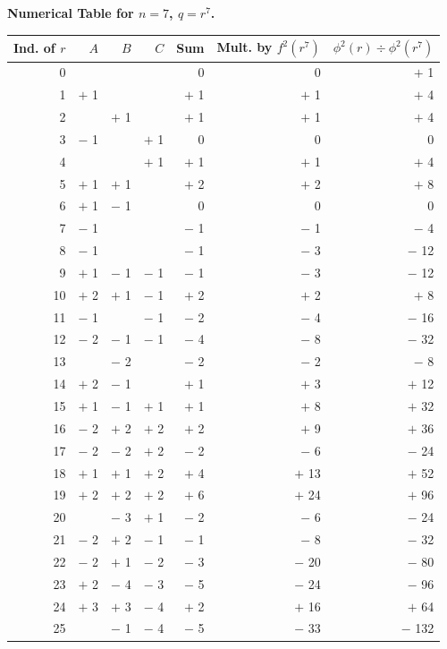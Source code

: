 \documentclass[12pt,a4paper]{article}
\begin{document}
\begin{center}
\textbf{Numerical Table for $n = 7$, $q = r^7$.}

\medskip
\begin{tabular}{|r|r|r|r|r|r|r|}
\hline
Ind. of $r$ & $A$ & $B$ & $C$ & Sum & Mult. by $f^2(r^7)$ & $\phi^2(r) \div \phi^2(r^7)$ \\
\hline
0 & & & & 0 & 0 & $+$ 1 \\
1 & $+$ 1 & & & $+$ 1 & $+$ 1 & $+$ 4 \\
2 & & $+$ 1 & & $+$ 1 & $+$ 1 & $+$ 4 \\
3 & $-$ 1 & & $+$ 1 & 0 & 0 & 0 \\
4 & & & $+$ 1 & $+$ 1 & $+$ 1 & $+$ 4 \\
5 & $+$ 1 & $+$ 1 & & $+$ 2 & $+$ 2 & $+$ 8 \\
6 & $+$ 1 & $-$ 1 & & 0 & 0 & 0 \\
7 & $-$ 1 & & & $-$ 1 & $-$ 1 & $-$ 4 \\
8 & $-$ 1 & & & $-$ 1 & $-$ 3 & $-$ 12 \\
9 & $+$ 1 & $-$ 1 & $-$ 1 & $-$ 1 & $-$ 3 & $-$ 12 \\
10 & $+$ 2 & $+$ 1 & $-$ 1 & $+$ 2 & $+$ 2 & $+$ 8 \\
11 & $-$ 1 & & $-$ 1 & $-$ 2 & $-$ 4 & $-$ 16 \\
12 & $-$ 2 & $-$ 1 & $-$ 1 & $-$ 4 & $-$ 8 & $-$ 32 \\
13 & & $-$ 2 & & $-$ 2 & $-$ 2 & $-$ 8 \\
14 & $+$ 2 & $-$ 1 & & $+$ 1 & $+$ 3 & $+$ 12 \\
15 & $+$ 1 & $-$ 1 & $+$ 1 & $+$ 1 & $+$ 8 & $+$ 32 \\
16 & $-$ 2 & $+$ 2 & $+$ 2 & $+$ 2 & $+$ 9 & $+$ 36 \\
17 & $-$ 2 & $-$ 2 & $+$ 2 & $-$ 2 & $-$ 6 & $-$ 24 \\
18 & $+$ 1 & $+$ 1 & $+$ 2 & $+$ 4 & $+$ 13 & $+$ 52 \\
19 & $+$ 2 & $+$ 2 & $+$ 2 & $+$ 6 & $+$ 24 & $+$ 96 \\
20 & & $-$ 3 & $+$ 1 & $-$ 2 & $-$ 6 & $-$ 24 \\
21 & $-$ 2 & $+$ 2 & $-$ 1 & $-$ 1 & $-$ 8 & $-$ 32 \\
22 & $-$ 2 & $+$ 1 & $-$ 2 & $-$ 3 & $-$ 20 & $-$ 80 \\
23 & $+$ 2 & $-$ 4 & $-$ 3 & $-$ 5 & $-$ 24 & $-$ 96 \\
24 & $+$ 3 & $+$ 3 & $-$ 4 & $+$ 2 & $+$ 16 & $+$ 64 \\
25 & & $-$ 1 & $-$ 4 & $-$ 5 & $-$ 33 & $-$ 132 \\

\end{tabular}
\end{center}
\end{document}
